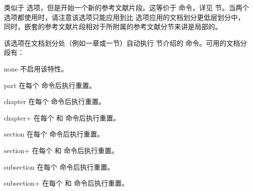 \begin{optionlist}

类似于  选项，但是开始一个新的参考文献片段。这等价于  命令，详见  节。当两个选项都使用时，请注意该选项只能应用到比  选项应用的文档划分更低层划分中，同时，嵌套的参考文献片段相对于所附属的参考文献分节来讲是局部的。



该选项在文档划分处（例如一章或一节）自动执行  节介绍的  命令。可用的文档分段有：

\begin{valuelist}
\item[none] %
不启用该特性。
\item[part] %
在每个   命令后执行重置。
\item[chapter] %
在每个   命令后执行重置。
\item[chapter+] %
在每个  和 命令后执行重置。
\item[section] %
在每个   命令后执行重置。
\item[section+] %
在每个   和 命令后执行重置。
\item[subsection] %
在每个   命令后执行重置。
\item[subsection+] %
在每个    和  命令后执行重置。
\end{valuelist}
%


\end{optionlist}
